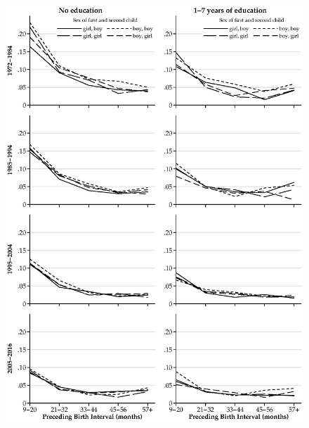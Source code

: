 \documentclass[12pt,letterpaper]{article}
\begin{document}
\begin{figure}
\centering
\includegraphics[width=\textwidth,height=\textheight,keepaspectratio=true]{mortality_spell_2_low_med}
\end{figure}
\end{document}
